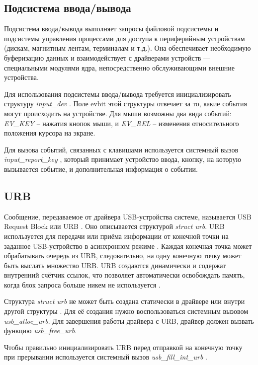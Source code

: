 \subsection{Подсистема ввода/вывода}
Подсистема ввода/вывода выполняет запросы файловой подсистемы и подсистемы управления процессами для доступа к периферийным устройствам (дискам, магнитным лентам, терминалам и т.д.). 
Она обеспечивает необходимую буферизацию данных и взаимодействует с драйверами устройств — специальными модулями ядра, непосредственно обслуживающими внешние устройства.

Для использования подсистемы ввода/вывода требуется инициализировать структуру \textit{input\_dev} \cite{input_dev}. 
Поле evbit этой структуры отвечает за то, какие события могут происходить на устройстве.
Для мыши возможны два вида событий: \textit{EV\_KEY} \cite{EV_KEY} -- нажатия кнопок мыши, и \textit{EV\_REL} -- изменения относительного положения курсора на экране.

Для вызова событий, связанных с клавишами используется системный вызов \textit{input\_report\_key} \cite{input_report_key}, который принимает устройство ввода, кнопку, на которую вызывается событие, и дополнительная информация о событии.

\subsection{URB}
Сообщение, передаваемое от драйвера USB-устройства системе, называется USB Request Block или URB \cite{ldd}. 
Оно описывается структурой \textit{struct urb}.
URB используется для передачи или приёма информации от конечной точки на заданное USB-устройство в асинхронном режиме \cite{urb}.
Каждая конечная точка может обрабатывать очередь из URB, следовательно, на одну конечную точку может быть выслать множество URB.
URB создаются динамически и содержат внутренний счётчик ссылок, что позволяет автоматически освобождать память, когда блок запроса больше никем не используется \cite{ldd}.

Структура \textit{struct urb} не может быть создана статически в драйвере или внутри другой структуры \cite{urb}. 
Для её создания нужно воспользоваться системным вызовом \textit{usb\_alloc\_urb}. 
Для завершения работы драйвера с URB, драйвер должен вызвать функцию \textit{usb\_free\_urb}.

Чтобы правильно инициализировать URB перед отправкой на конечную точку при прерывании используется системный вызов \textit{ usb\_fill\_int\_urb} \cite{int}. 

